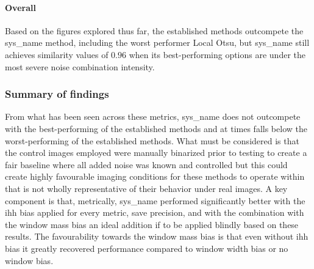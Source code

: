 \paragraph{Overall}
Based on the figures explored thus far, the established methods outcompete the \gls{sys_name} method, including the worst performer Local Otsu, but \gls{sys_name} still achieves similarity values of $0.96$ when its best-performing options are under the most severe noise combination intensity.

\subsubsection{Summary of findings}
From what has been seen across these metrics, \gls{sys_name} does not outcompete with the best-performing of the established methods and at times falls below the worst-performing of the established methods. What must be considered is that the control images employed were manually binarized prior to testing to create a fair baseline where all added noise was known and controlled but this could create highly favourable imaging conditions for these methods to operate within that is not wholly representative of their behavior under real images. A key component is that, metrically, \gls{sys_name} performed significantly better with the \gls{ihh} bias applied for every metric, save precision, and with the combination with the window mass bias an ideal addition if to be applied blindly based on these results. The favourability towards the window mass bias is that even without \gls{ihh} bias it greatly recovered performance compared to window width bias or no window bias.

\clearpage
